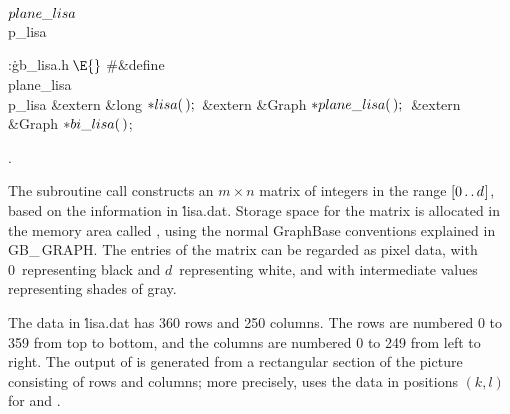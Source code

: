 \Y\B\4\D$\\{plane\_lisa}$ \5
\\{p\_lisa}\par
\Y\B\4:\.{gb\_lisa.h\,}\X${}\E{}$\6
\8\#\&{define} \\{plane\_lisa}\5\\{p\_lisa}\6
\&{extern} \&{long} ${}{*}\\{lisa}(\,);{}$\6
\&{extern} \&{Graph} ${}{*}\\{plane\_lisa}(\,);{}$\6
\&{extern} \&{Graph} ${}{*}\\{bi\_lisa}(\,){}$;\par
{}.\fi

The subroutine call 
constructs an $m\times n$ matrix of integers in the range
$[0\,.\,.\,d\mskip1mu]$,
based on the information in \.{lisa.dat}. Storage space for the matrix is
allocated in the memory area called , using the normal GraphBase
conventions explained in {\sc GB\_\,GRAPH}.
The entries of the matrix can be regarded as pixel data, with
0~representing black and $d$~representing white, and with intermediate
values representing shades of gray.

The data in \.{lisa.dat} has 360 rows and 250 columns. The rows are numbered
0 to 359 from top to bottom, and the columns are numbered 0 to 249 from left
to right. The output of  is generated from a rectangular section
of the picture consisting of  rows and 
columns; more
precisely,  uses the data in positions $(k,l)$ for
 and .

